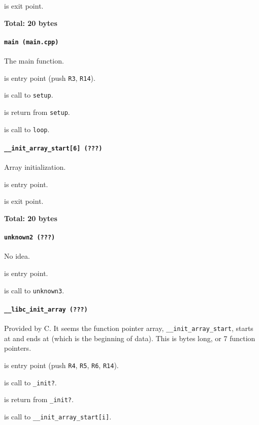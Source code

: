 is exit point.

\textbf{Total: 20 bytes}

\paragraph{\texttt{main (main.cpp)}} The main function.

 is entry point (push \texttt{R3}, \texttt{R14}).

 is call to \texttt{setup}.

 is return from \texttt{setup}.

 is call to \texttt{loop}.

\paragraph{\texttt{\_\_init\_array\_start[6] (???)}} Array initialization.

 is entry point.

 is exit point.

\textbf{Total: 20 bytes}

\paragraph{\texttt{unknown2 (???)}} No idea.

 is entry point.

 is call to \texttt{unknown3}.

\paragraph{\texttt{\_\_libc\_init\_array (???)}} Provided by C. It seems the
function pointer array,  \texttt{\_\_init\_array\_start}, starts at
 and ends at  (which is the beginning of
data). This is  bytes long, or 7 function pointers.

 is entry point (push \texttt{R4}, \texttt{R5},
\texttt{R6}, \texttt{R14}).

 is call to \texttt{\_init?}.

 is return from \texttt{\_init?}.

 is call to \texttt{\_\_init\_array\_start[i]}.

